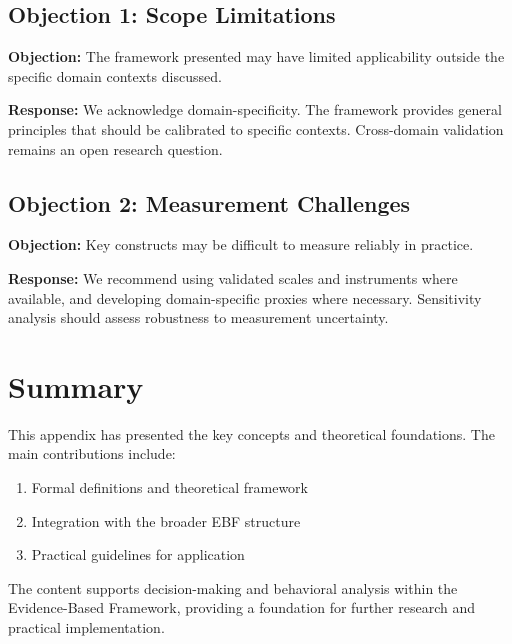 \subsection{Objection 1: Scope Limitations}

\textbf{Objection:} The framework presented may have limited applicability
outside the specific domain contexts discussed.

\textbf{Response:} We acknowledge domain-specificity. The framework provides
general principles that should be calibrated to specific contexts. Cross-domain
validation remains an open research question.

\subsection{Objection 2: Measurement Challenges}

\textbf{Objection:} Key constructs may be difficult to measure reliably in
practice.

\textbf{Response:} We recommend using validated scales and instruments where
available, and developing domain-specific proxies where necessary. Sensitivity
analysis should assess robustness to measurement uncertainty.



\section{Summary}
\label{sec:cas-summary}

This appendix has presented the key concepts and theoretical foundations.
The main contributions include:

\begin{enumerate}
    \item Formal definitions and theoretical framework
    \item Integration with the broader EBF structure
    \item Practical guidelines for application
\end{enumerate}

The content supports decision-making and behavioral analysis within the
Evidence-Based Framework, providing a foundation for further research
and practical implementation.


